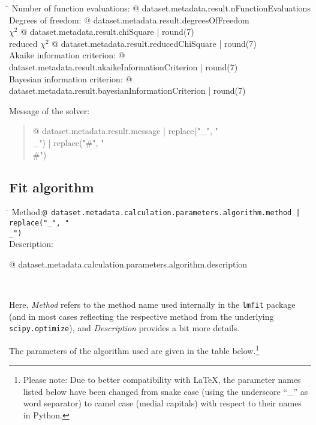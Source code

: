 \begin{tabbing}
\hspace*{5.5cm}\=\kill
Number of function evaluations:\> {@ dataset.metadata.result.nFunctionEvaluations }
\\
Degrees of freedom:\> {@ dataset.metadata.result.degreesOfFreedom }
\\
$\chi^2$\> {@ dataset.metadata.result.chiSquare | round(7) }
\\
reduced $\chi^2$\> {@ dataset.metadata.result.reducedChiSquare | round(7) }
\\
Akaike information criterion:\> {@ dataset.metadata.result.akaikeInformationCriterion | round(7) }
\\
Bayesian information criterion:\> {@ dataset.metadata.result.bayesianInformationCriterion | round(7) }
\end{tabbing}

Message of the solver:

\begin{quote}
{@ dataset.metadata.result.message | replace("_", "\\_") | replace("#", "\\#") }
\end{quote}

\subsection{Fit algorithm}

\begin{tabbing}
\hspace*{2.5cm}\=\kill
Method:\>\texttt{{@ dataset.metadata.calculation.parameters.algorithm.method  | replace("_", "\\_")}}
\\
Description:\>\parbox[t]{13.5cm}{\raggedright {@ dataset.metadata.calculation.parameters.algorithm.description }}
\\
\end{tabbing}

Here, \emph{Method} refers to the method name used internally in the \texttt{lmfit} package (and in most cases reflecting the respective method from the underlying \texttt{scipy.optimize}), and \emph{Description} provides a bit more details.

The parameters of the algorithm used are given in the table below.\footnote{Please note: Due to better compatibility with \LaTeX{}, the parameter names listed below have been changed from snake case (using the underscore \enquote{\_} as word separator) to camel case (medial capitals) with respect to their names in Python.}

